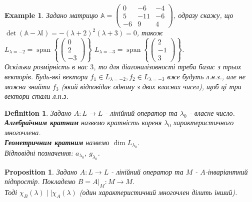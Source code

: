 \documentclass[a4paper, 10pt]{article}
\theoremstyle{theoremdd}
\newtheorem{definition}[theorem]{Definition}
\newtheorem{example}[theorem]{Example}
\newtheorem{proposition}[theorem]{Proposition}
\DeclareMathOperator{\linspan}{span}
\begin{document}
\begin{example}
\label{non_diagonalizable_because_not_enough_dim}
Задано матрицю $\mathbb{A} = \begin{pmatrix}
0 & -6 & -4 \\
5 & -11 & -6 \\
-6 & 9 & 4
\end{pmatrix}$, одразу скажу, що\\
$\det (\mathbb{A} - \lambda \mathbb{I}) = -(\lambda+2)^2(\lambda+3)=0$, також\\
$L_{\lambda = -2} = \linspan \left\{ \begin{pmatrix}
0 \\ 2 \\ -3
\end{pmatrix} \right\}$ \hspace{2cm}
$L_{\lambda = -3} = \linspan \left\{ \begin{pmatrix}
2 \\ -1 \\ 3
\end{pmatrix} \right\}$.\\
Оскільки розмірність в нас $3$, то для діагоналізовності треба базис з трьох векторів. Будь-які вектори $f_1 \in L_{\lambda = -2}, f_2 \in L_{\lambda = -3}$ вже будуть л.н.з., але не можна знайти $f_3$ (який відповідає одному з двох власних чисел), щоб ці три вектори стали л.н.з.
\end{example}

\begin{definition}
Задано $A \colon L \to L$ - лінійний оператор та $\lambda_0$ - власне число.\\
\textbf{Алгебраїчним кратним} назвемо кратність кореня $\lambda_0$ характеристичного многочлена.\\
\textbf{Геометричним кратним} назвемо $\dim L_{\lambda_0}$.\\
Відповідні позначення: $a_{\lambda_0},\ g_{\lambda_0}$.
\end{definition}

\begin{proposition}
Задано $A \colon L \to L$ - лінійний оператор та $M$ - $A$-інваріантний підпростір. Покладемо $B = A|_{M} \colon M \to M$.\\
Тоді $\chi_B(\lambda) \mid| \chi_A(\lambda)$ (один характеристичний многочлен ділить інший).
\end{proposition}
\end{document}

